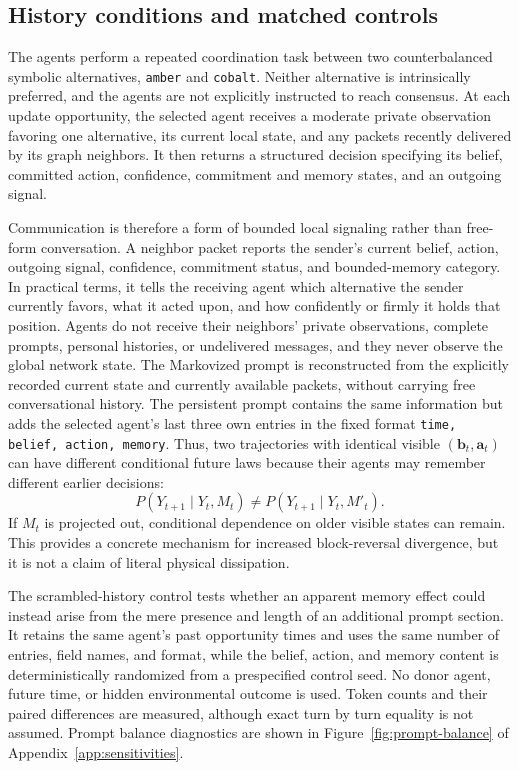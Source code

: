 \documentclass[12pt]{article}
\begin{document}
\subsection{History conditions and matched controls}
\label{sec:history-conditions}

The agents perform a repeated coordination task between two counterbalanced
symbolic alternatives, \texttt{amber} and \texttt{cobalt}. Neither alternative
is intrinsically preferred, and the agents are not explicitly instructed to
reach consensus. At each update opportunity, the selected agent receives a
moderate private observation favoring one alternative, its current local
state, and any packets recently delivered by its graph neighbors. It then
returns a structured decision specifying its belief, committed action,
confidence, commitment and memory states, and an outgoing signal.

Communication is therefore a form of bounded local signaling rather than
free-form conversation. A neighbor packet reports the sender's current belief,
action, outgoing signal, confidence, commitment status, and bounded-memory
category. In practical terms, it tells the receiving agent which alternative
the sender currently favors, what it acted upon, and how confidently or
firmly it holds that position. Agents do not receive their neighbors' private
observations, complete prompts, personal histories, or undelivered messages,
and they never observe the global network state.
The Markovized prompt is reconstructed from the explicitly recorded current
state and currently available packets, without carrying free conversational
history. The persistent prompt contains the same information but adds the
selected agent's last three own entries in the fixed format
\texttt{time, belief, action, memory}. Thus, two trajectories with identical
visible $(\bm b_t,\bm a_t)$ can have different conditional future laws because
their agents may remember different earlier decisions:
\begin{equation}
P(Y_{t+1}\mid Y_t,M_t)\ne P(Y_{t+1}\mid Y_t,M'_t).
\end{equation}
If $M_t$ is projected out, conditional dependence on older visible states can
remain. This provides a concrete mechanism for increased block-reversal
divergence, but it is not a claim of literal physical dissipation.

The scrambled-history control tests whether an apparent memory effect could
instead arise from the mere presence and length of an additional prompt
section. It retains the same agent's past opportunity times and uses the same
number of entries, field names, and format, while the belief, action, and
memory content is deterministically randomized from a prespecified control
seed. No donor agent, future time, or hidden environmental outcome is used.
Token counts and their paired differences are measured, although exact
turn by turn equality is not assumed. Prompt balance diagnostics are shown in
Figure~\ref{fig:prompt-balance} of Appendix~\ref{app:sensitivities}.
\end{document}
